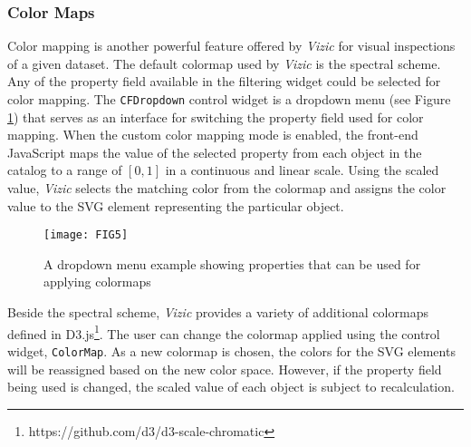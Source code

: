 \documentclass[../vis.tex]{subfiles}
\begin{document}
\subsubsection{Color Maps}
\label{color maps}
Color mapping is another powerful feature offered by \textit{Vizic} for visual inspections of a given dataset. The default colormap used by \textit{Vizic} is the spectral scheme. Any of the property field available in the filtering widget could be selected for color mapping. The \texttt{CFDropdown} control widget is a dropdown menu (see Figure \ref{fig:cdrop}) that serves as an interface for switching the property field used for color mapping.
When the custom color mapping mode is enabled, the front-end JavaScript maps the value of the selected property from each object in the catalog to a range of $[0, 1]$ in a continuous and linear scale. Using the scaled value, \textit{Vizic} selects the matching color from the colormap and assigns the color value to the SVG element representing the particular object.
\begin{figure}
\centering
\texttt{[image: FIG5]}
\caption{A dropdown menu example showing properties that can be used for applying colormaps}
\label{fig:cdrop}
\end{figure}
Beside the spectral scheme, \textit{Vizic} provides a variety of additional colormaps defined in D3.js\footnote{https://github.com/d3/d3-scale-chromatic}. The user can change the colormap applied using the control widget, \texttt{ColorMap}. As a new colormap is chosen, the colors for the SVG elements will be reassigned based on the new color space. However, if the property field being used is changed, the scaled value of each object is subject to recalculation.
\end{document}
